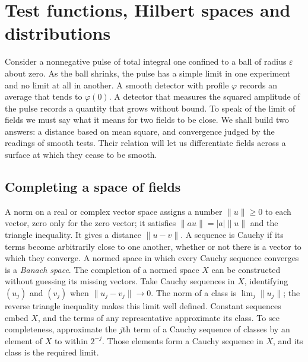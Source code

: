 \chapter{Test functions, Hilbert spaces and distributions}\label{f:distributions}

Consider a nonnegative pulse of total integral one confined to a ball of radius $\varepsilon$ about zero. As the ball shrinks, the pulse has a simple limit in one experiment and no limit at all in another. A smooth detector with profile $\varphi$ records an average that tends to $\varphi(0)$. A detector that measures the squared amplitude of the pulse records a quantity that grows without bound. To speak of the limit of fields we must say what it means for two fields to be close. We shall build two answers: a distance based on mean square, and convergence judged by the readings of smooth tests. Their relation will let us differentiate fields across a surface at which they cease to be smooth.

\section{Completing a space of fields}\label{f:distributions-completion}

A norm on a real or complex vector space assigns a number $\|u\|\geq0$ to each vector, zero only for the zero vector; it satisfies $\|au\|=|a|\|u\|$ and the triangle inequality. It gives a distance $\|u-v\|$. A sequence is Cauchy if its terms become arbitrarily close to one another, whether or not there is a vector to which they converge. A normed space in which every Cauchy sequence converges is a \emph{Banach space}. The completion of a normed space $X$ can be constructed without guessing its missing vectors. Take Cauchy sequences in $X$, identifying $(u_j)$ and $(v_j)$ when $\|u_j-v_j\|\to0$. The norm of a class is $\lim_j\|u_j\|$; the reverse triangle inequality makes this limit well defined. Constant sequences embed $X$, and the terms of any representative approximate its class. To see completeness, approximate the $j$th term of a Cauchy sequence of classes by an element of $X$ to within $2^{-j}$. Those elements form a Cauchy sequence in $X$, and its class is the required limit.

